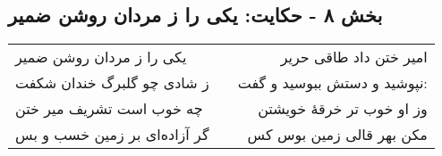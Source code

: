 \begin{center}
\section*{بخش ۸ - حکایت: یکی را ز مردان روشن ضمیر}
\label{sec:008}
\begin{longtable}{l p{0.5cm} r}
یکی را ز مردان روشن ضمیر
&&
امیر ختن داد طاقی حریر
\\
ز شادی چو گلبرگ خندان شکفت
&&
نپوشید و دستش ببوسید و گفت:
\\
چه خوب است تشریف میر ختن
&&
وز او خوب تر خرقهٔ خویشتن
\\
گر آزاده‌ای بر زمین خسب و بس
&&
مکن بهر قالی زمین بوس کس
\\
\end{longtable}
\end{center}
